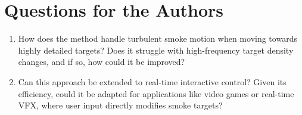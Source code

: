 \documentclass[11pt]{article}
\begin{document}
\section{Questions for the Authors}
\begin{enumerate}
    \item How does the method handle turbulent smoke motion when moving towards highly detailed targets? Does it struggle with high-frequency target density changes, and if so, how could it be improved?
    \item Can this approach be extended to real-time interactive control? Given its efficiency, could it be adapted for applications like video games or real-time VFX, where user input directly modifies smoke targets?
\end{enumerate}
\end{document}
